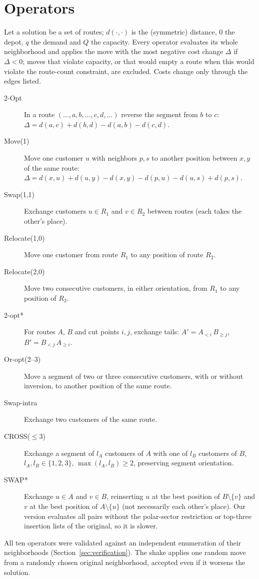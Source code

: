 \section{Operators}\label{app:operators}
\setcounter{table}{0}
Let a solution be a set of routes; $d(\cdot,\cdot)$ is the (symmetric) distance, $0$ the depot, $q$ the demand and $Q$ the capacity. Every operator evaluates its whole neighborhood and applies the move with the most negative cost change $\Delta$ if $\Delta<0$; moves that violate capacity, or that would empty a route when this would violate the route-count constraint, are excluded. Costs change only through the edges listed.
\begin{description}
\item[2-Opt] In a route $(\dots,a,b,\dots,c,d,\dots)$ reverse the segment from $b$ to $c$: $\Delta=d(a,c)+d(b,d)-d(a,b)-d(c,d)$.
\item[Move(1)] Move one customer $u$ with neighbors $p,s$ to another position between $x,y$ of the same route: $\Delta=d(x,u)+d(u,y)-d(x,y)-d(p,u)-d(u,s)+d(p,s)$.
\item[Swap(1,1)] Exchange customers $u\in R_1$ and $v\in R_2$ between routes (each takes the other's place).
\item[Relocate(1,0)] Move one customer from route $R_1$ to any position of route $R_2$.
\item[Relocate(2,0)] Move two consecutive customers, in either orientation, from $R_1$ to any position of $R_2$.
\item[2-opt*] For routes $A$, $B$ and cut points $i,j$, exchange tails: $A'=A_{<i}\,B_{\ge j}$, $B'=B_{<j}\,A_{\ge i}$.
\item[Or-opt(2--3)] Move a segment of two or three consecutive customers, with or without inversion, to another position of the same route.
\item[Swap-intra] Exchange two customers of the same route.
\item[CROSS($\le3$)] Exchange a segment of $l_A$ customers of $A$ with one of $l_B$ customers of $B$, $l_A,l_B\in\{1,2,3\}$, $\max(l_A,l_B)\ge2$, preserving segment orientation.
\item[SWAP*] \citep{vidal2022} Exchange $u\in A$ and $v\in B$, reinserting $u$ at the best position of $B\setminus\{v\}$ and $v$ at the best position of $A\setminus\{u\}$ (not necessarily each other's place). Our version evaluates all pairs without the polar-sector restriction or top-three insertion lists of the original, so it is slower.
\end{description}
All ten operators were validated against an independent enumeration of their neighborhoods (Section~\ref{sec:verification}). The shake applies one random move from a randomly chosen original neighborhood, accepted even if it worsens the solution.

